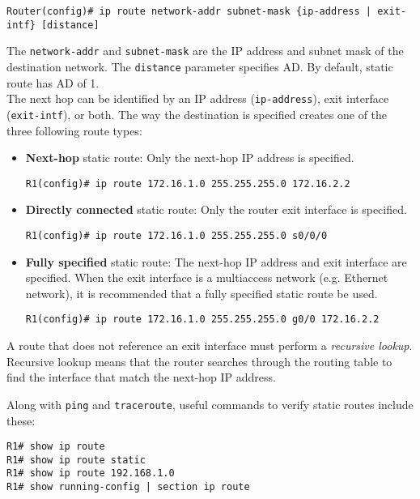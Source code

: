 \begin{verbatim}
Router(config)# ip route network-addr subnet-mask {ip-address | exit-intf} [distance]
\end{verbatim}

The \verb|network-addr| and \verb|subnet-mask| are the IP address and subnet mask of the destination network. The \verb|distance| parameter specifies AD. By default, static route has AD of 1.\\

The next hop can be identified by an IP address (\verb|ip-address|), exit interface (\verb|exit-intf|), or both. The way the destination is specified creates one of the three following route types:

\begin{itemize}
\item \textbf{Next-hop} static route: Only the next-hop IP address is specified.

\begin{verbatim}
R1(config)# ip route 172.16.1.0 255.255.255.0 172.16.2.2
\end{verbatim}

\item \textbf{Directly connected} static route: Only the router exit interface is specified.

\begin{verbatim}
R1(config)# ip route 172.16.1.0 255.255.255.0 s0/0/0
\end{verbatim}

\item \textbf{Fully specified} static route: The next-hop IP address and exit interface are specified. When the exit interface is a multiaccess network (e.g. Ethernet network), it is recommended that a fully specified static route be used. 

\begin{verbatim}
R1(config)# ip route 172.16.1.0 255.255.255.0 g0/0 172.16.2.2
\end{verbatim}
\end{itemize}

A route that does not reference an exit interface must perform a \emph{recursive lookup}. Recursive lookup means that the router searches through the routing table to find the interface that match the next-hop IP address. 

Along with \verb|ping| and \verb|traceroute|, useful commands to verify static routes include these:
\begin{verbatim}
R1# show ip route
R1# show ip route static
R1# show ip route 192.168.1.0
R1# show running-config | section ip route
\end{verbatim}

